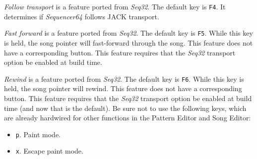 %
%

   \textsl{Follow transport} is a feature ported from \textsl{Seq32}.
   The default key is \texttt{F4}.
   It determines if \textsl{Sequencer64} follows JACK transport.

   \textsl{Fast forward} is a feature ported from \textsl{Seq32}.
   The default key is \texttt{F5}.
   While this key is held, the song pointer will fast-forward
   through the song.
   This feature does not have a corresponding button.
   This feature requires that the \textsl{Seq32} transport option be
   enabled at build time.

   \textsl{Rewind} is a feature ported from \textsl{Seq32}.
   The default key is \texttt{F6}.
   While this key is held, the song pointer will rewind.
   This feature does not have a corresponding button.
   This feature requires that the \textsl{Seq32} transport option be
   enabled at build time (and now that is the default).
   Be sure not to use the following keys, which are already
   hardwired for other functions in the Pattern Editor and Song Editor:

   \begin{itemize}
      \item \texttt{p}.  Paint mode.
      \item \texttt{x}.  Escape paint mode.
   \end{itemize}

